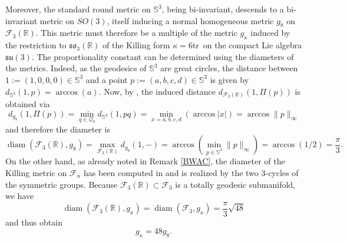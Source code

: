 \documentclass[11pt,twoside]{amsart}
\theoremstyle{plain}
\newcommand{\R}{{\mathbb R}}
\newcommand{\Sph}{\mathbb{S}}
\newcommand{\tr}{\mathrm{tr}\,}
\DeclareMathOperator\diam{diam}
\begin{document}
Moreover, the standard round metric on $\Sph^3$, being bi-invariant, descends to a bi-invariant metric on $SO(3)$, itself inducing a normal homogeneous metric $g_8$ on $\mathcal{F}_3(\R)$. This metric must therefore be a multiple of the metric $g_\kappa$ induced by the restriction to $\mathfrak{so}_3(\R)$ of the Killing form $\kappa=6\tr$ on the compact Lie algebra $\mathfrak{su}(3)$. The proportionality constant can be determined using the diameters of the metrics. Indeed, as the geodesics of $\Sph^3$ are great circles, the distance between $1:=(1,0,0,0)\in\Sph^3$ and a point $p:=(a,b,c,d)\in\Sph^3$ is given by $d_{\Sph^3}(1,p)=\arccos(a)$. Now, by \cite[Corollary 2.29]{lee_riema}, the induced distance $d_{\mathcal{F}_3(\R)}(1,\Pi(p))$ is obtained via
\[d_{g_8}(1,\Pi(p))=\min_{q\in\mathcal{Q}_8}d_{\Sph^3}(1,pq)=\min_{x=a,b,c,d}(\arccos|x|)=\arccos\|p\|_\infty\]
and therefore the diameter is
\[\diam(\mathcal{F}_3(\R),g_8)=\max_{\mathcal{F}_3(\R)}d_{g_8}(1,-)=\arccos\left(\min_{p\in\Sph^3}\|p\|_\infty\right)=\arccos(1/2)=\frac{\pi}{3}.\]
On the other hand, as already noted in Remark \ref{BWAC}, the diameter of the Killing metric on $\mathcal{F}_n$ has been computed in \cite{agrachev-chambrion} and is realized by the two 3-cycles of the symmetric groups. Because $\mathcal{F}_3(\R)\subset\mathcal{F}_3$ is a totally geodesic submanifold, we have
\[\diam(\mathcal{F}_3(\R),g_\kappa)=\diam(\mathcal{F}_3,g_\kappa)=\frac{\pi}{3}\sqrt{48}\]
and thus obtain
\begin{equation}\label{propto}
g_\kappa=48g_8.
\end{equation}
\end{document}
